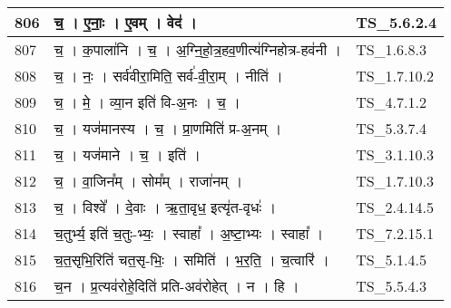\documentclass[17pt]{extarticle}
\begin{document}
\begin{longtable}{||p{0.4in}||p{4.9in}||p{0.9in}||}
    \hline
        
    806 & च॒   ।   ए॒नाः॒   ।   ए॒वम्   ।   वेद॑   ।    & TS\_5.6.2.4       \\
    
    \hline
        
    807 & च॒   ।   क॒पाला॑नि   ।   च॒   ।   अ॒ग्नि॒हो॒त्र॒हव॒णीत्य॑ग्निहोत्र{-}हव॑नी   ।    & TS\_1.6.8.3       \\
    
    \hline
        
    808 & च॒   ।   नः॒   ।   सर्व॑वीरा॒मिति॒ सर्व॑{-}वी॒रा॒म्   ।   नीति॑   ।    & TS\_1.7.10.2       \\
    
    \hline
        
    809 & च॒   ।   मे॒   ।   व्या॒न इति॑ वि{-}अ॒नः   ।   च॒   ।    & TS\_4.7.1.2       \\
    
    \hline
        
    810 & च॒   ।   यज॑मानस्य   ।   च॒   ।   प्रा॒णमिति॑ प्र{-}अ॒नम्   ।    & TS\_5.3.7.4       \\
    
    \hline
        
    811 & च॒   ।   यज॑माने   ।   च॒   ।   इति॑   ।    & TS\_3.1.10.3       \\
    
    \hline
        
    812 & च॒   ।   वा॒जिन᳚म्   ।   सोम᳚म्   ।   राजा॑नम्   ।    & TS\_1.7.10.3       \\
    
    \hline
        
    813 & च॒   ।   विश्वे᳚   ।   दे॒वाः   ।   ऋ॒ता॒वृध॒ इत्यृ॑त{-}वृधः॑   ।    & TS\_2.4.14.5       \\
    
    \hline
        
    814 & च॒तुर्भ्य॒ इति॑ च॒तुः{-}भ्यः॒   ।   स्वाहा᳚   ।   अ॒ष्टा॒भ्यः   ।   स्वाहा᳚   ।    & TS\_7.2.15.1       \\
    
    \hline
        
    815 & च॒त॒सृभि॒रिति॑ चत॒सृ{-}भिः॒   ।   समिति॑   ।   भ॒र॒ति॒   ।   च॒त्वारि॑   ।    & TS\_5.1.4.5       \\
    
    \hline
        
    816 & च॒न   ।   प्र॒त्यव॑रोहे॒दिति॑ प्रति{-}अव॑रोहेत्   ।   न   ।   हि   ।    & TS\_5.5.4.3       \\
    

\end{longtable}
\end{document}
